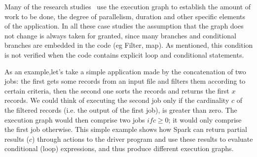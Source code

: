 Many of the research studies~\cite{gibilisco2016stage,Sidhanta2016, dSpark, nfm} use the execution graph to establish the amount of work to be done, the degree of parallelism, duration and other specific elements of the application. In all these case studies the assumption that the graph does not change is always taken for granted, since many branches and conditional branches are embedded in the code (eg Filter, map). As mentioned, this condition is not verified when the code contains explicit loop and conditional statements.


As an example,let's take a simple application made by the concatenation of two jobs: the first  gets some records from an input file and filters them according to certain criteria, then the  second one sorts the records and returns the first $x$ records. We could think of executing the second job only if the cardinality $c$ of the filtered records (i.e. the output of the first job), is greater than zero. The execution graph would then comprise two jobs $if c \geq 0$; it would only comprise the first job otherwise. This simple example shows how Spark can return partial results ($c$) through actions to the driver program and use these results to evaluate conditional (loop) expressions, and thus produce different execution graphs.

